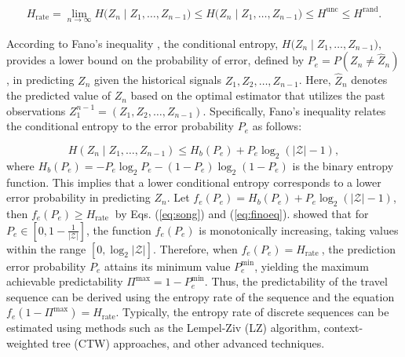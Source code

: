 \documentclass[12pt,review,authoryear]{elsarticle}
\theoremstyle{upright}
\begin{document}
\begin{align}
      H_{\mathrm{rate}} = \lim_{n\to\infty} H\!\bigl(Z_n \mid Z_1,\dots,Z_{n-1}\bigr)
  \le H\!\bigl(Z_n \mid Z_1,\dots,Z_{n-1}\bigr)
       \le H^{\mathrm{unc}}
       \le H^{\mathrm{rand}}.
\label{eq:song}
\end{align}

According to Fano's inequality \citep{cover1999elements}, the conditional entropy, $H\bigl(Z_n \mid Z_1,\allowbreak\dots,\allowbreak Z_{n-1}\bigr)$, provides a lower bound on the probability of error, defined by \( P_e = P(Z_n \neq \hat{Z}_n) \), in predicting \( Z_n \) given the historical signals \( Z_1, Z_2, \dots, Z_{n-1} \). Here, $\hat{Z}_n$ denotes the predicted value of $Z_n$ based on the optimal estimator that utilizes the past observations $Z_1^{n-1}=\left(Z_1, Z_2, \ldots, Z_{n-1}\right)$.  Specifically, Fano's inequality relates the conditional entropy to the error probability \( P_e \) as follows:
    
\begin{equation}
    H\left(Z_n \mid Z_1, \dots, Z_{n-1}\right) \leq H_b(P_e) + P_e \log_2 \left(|\mathcal{Z}| - 1\right),
    \label{eq:finoeq}
\end{equation}
where \( H_b(P_e) = -P_e \log_2 P_e - (1 - P_e) \log_2 (1 - P_e) \) is the binary entropy function. This implies that a lower conditional entropy corresponds to a lower error probability in predicting \( Z_n \). Let \( f_e(P_e) = H_b(P_e) + P_e \log_2 \left(|\mathcal{Z}| - 1\right) \), then $f_e\left(P_e\right) \geq H_{\text {rate }}$ by Eqs. (\ref{eq:song}) and (\ref{eq:finoeq}). \citet{song2010limits} showed that for $P_e \in \left[0, 1 - \frac{1}{|\mathcal{Z}|}\right]$, the function $f_e(P_e)$ is monotonically increasing, taking values within the range $[0, \log_2 |\mathcal{Z}|]$. Therefore, when $f_e\left(P_e\right)=H_{\text {rate }}$, the prediction error probability $P_e$ attains its minimum value $P_e^{\min }$, yielding the maximum achievable predictability $\Pi^{\max }=1-P_e^{\min }$. Thus, the predictability of the travel sequence can be derived using the entropy rate of the sequence and the equation \( f_e(1-\Pi^{\mathrm{max}}) = H_{\mathrm{rate}} \). Typically, the entropy rate of discrete sequences can be estimated using methods such as the Lempel-Ziv (LZ) algorithm, context-weighted tree (CTW) approaches, and other advanced techniques.
\end{document}
